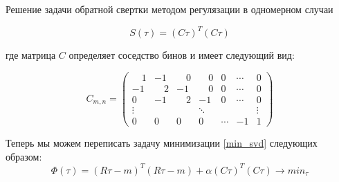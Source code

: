 \documentclass[fullscreen=true,russian,compress,%
	hyperref={unicode,bookmarks=false}]{presentation}
\begin{document}



\begin{frame}{Решение задачи обратной свертки методом регулязации в одномерном случаи}

   \begin{equation}
      S(\tau) = (C\tau)^T(C\tau)
  \end{equation}
 
  где матрица $C$ определяет соседство бинов и имеет следующий вид:

   \begin{equation}
       C_{m,n} = 
    \begin{pmatrix}
      \quad 1 &       -1 &  \quad 0 &  \quad 0 & 0 & \cdots & 0 \\
           -1 &  \quad 2 &       -1 &  \quad 0 & 0 & \cdots & 0 \\
            0 &       -1 & \quad  2 &       -1 & 0 & \cdots & 0 \\
     \vdots &  & & \ddots & & & \vdots \\
     0  & 0  & 0 & 0 & \cdots & -1 & 1
    \end{pmatrix}
    \label{one_dim_neighbors_mat}
   \end{equation}

   Теперь мы можем переписать задачу минимизации \eqref{min_svd} следующих образом:
   \begin{equation}
      \Phi(\tau)=(R\tau-m)^T (R\tau-m) + \alpha(C\tau)^T(C\tau) \to min_{\tau}
      \label{min_one_dim}
   \end{equation}
\end{frame}
\end{document}
